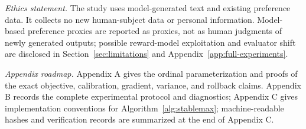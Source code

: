 \documentclass{article}
\theoremstyle{definition}
\theoremstyle{remark}
\begin{document}
\emph{Ethics statement.} The study uses model-generated text and existing
preference data.  It collects no new human-subject data or personal
information.  Model-based preference proxies are reported as proxies, not as
human judgments of newly generated outputs; possible reward-model exploitation
and evaluator shift are disclosed in Section~\ref{sec:limitations} and
Appendix~\ref{app:full-experiments}.
\clearpage


\clearpage
\appendix
\emph{Appendix roadmap.}
Appendix A gives the ordinal parameterization and proofs of the exact objective,
calibration, gradient, variance, and rollback claims.  Appendix B records the
complete experimental protocol and diagnostics; Appendix C gives implementation
conventions for Algorithm~\ref{alg:stablemax}; machine-readable hashes and
verification records are summarized at the end of Appendix C.
\makeatletter
\renewcommand{\theHtable}{appendix.\arabic{table}}
\renewcommand{\theHfigure}{appendix.\arabic{figure}}
\renewcommand{\theHalgocf}{appendix.\arabic{algocf}}
\makeatother



\end{document}
